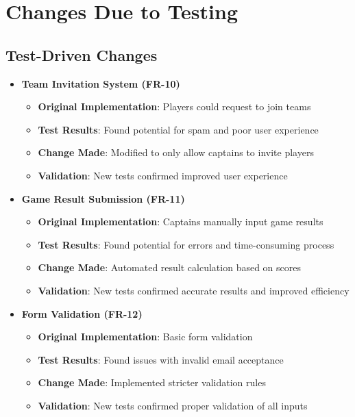 \documentclass[12pt, titlepage]{article}
\begin{document}
\section{Changes Due to Testing}

\subsection{Test-Driven Changes}

\begin{itemize}
    \item \textbf{Team Invitation System (FR-10)}
    \begin{itemize}
        \item \textbf{Original Implementation}: Players could request to join teams
        \item \textbf{Test Results}: Found potential for spam and poor user experience
        \item \textbf{Change Made}: Modified to only allow captains to invite players
        \item \textbf{Validation}: New tests confirmed improved user experience
    \end{itemize}
    
    \item \textbf{Game Result Submission (FR-11)}
    \begin{itemize}
        \item \textbf{Original Implementation}: Captains manually input game results
        \item \textbf{Test Results}: Found potential for errors and time-consuming process
        \item \textbf{Change Made}: Automated result calculation based on scores
        \item \textbf{Validation}: New tests confirmed accurate results and improved efficiency
    \end{itemize}
    
    \item \textbf{Form Validation (FR-12)}
    \begin{itemize}
        \item \textbf{Original Implementation}: Basic form validation
        \item \textbf{Test Results}: Found issues with invalid email acceptance
        \item \textbf{Change Made}: Implemented stricter validation rules
        \item \textbf{Validation}: New tests confirmed proper validation of all inputs
    \end{itemize}
\end{itemize}
\end{document}
